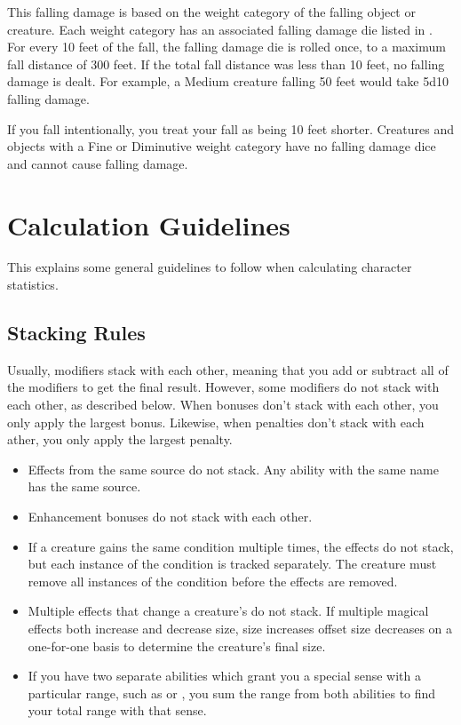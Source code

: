         This falling damage is based on the weight category of the falling object or creature.
        Each weight category has an associated falling damage die listed in .
        For every 10 feet of the fall, the falling damage die is rolled once, to a maximum fall distance of 300 feet.
        If the total fall distance was less than 10 feet, no falling damage is dealt.
        For example, a Medium creature falling 50 feet would take 5d10 falling damage.

        If you fall intentionally, you treat your fall as being 10 feet shorter.
        Creatures and objects with a Fine or Diminutive weight category have no falling damage dice and cannot cause falling damage.

\section{Calculation Guidelines}
    This explains some general guidelines to follow when calculating character statistics.

    \subsection{Stacking Rules}\label{Stacking Rules}
        Usually, modifiers stack with each other, meaning that you add or subtract all of the modifiers to get the final result.
        However, some modifiers do not stack with each other, as described below.
        When bonuses don't stack with each other, you only apply the largest bonus.
        Likewise, when penalties don't stack with each ather, you only apply the largest penalty.

        \begin{itemize}
            \item Effects from the same source do not stack. Any ability with the same name has the same source.
            \item Enhancement bonuses do not stack with each other.
            \item If a creature gains the same condition multiple times, the effects do not stack, but each instance of the condition is tracked separately.
                The creature must remove all instances of the condition before the effects are removed.
            \item Multiple \magical effects that change a creature's  do not stack.
                If multiple magical effects both increase and decrease size, size increases offset size decreases on a one-for-one basis to determine the creature's final size.
            \item If you have two separate abilities which grant you a special sense with a particular range, such as  or , you sum the range from both abilities to find your total range with that sense.
        \end{itemize}

